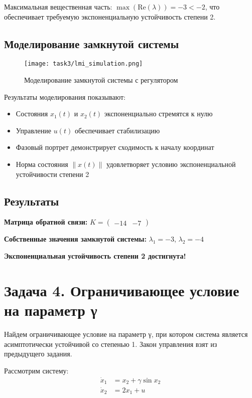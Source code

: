 Максимальная вещественная часть: $\max(\text{Re}(\lambda)) = -3 < -2$, что обеспечивает требуемую экспоненциальную устойчивость степени 2.

\subsection{Моделирование замкнутой системы}

\begin{figure}[H]
\centering
\texttt{[image: task3/lmi\_simulation.png]}
\caption{Моделирование замкнутой системы с регулятором}
\label{fig:lmi_simulation}
\end{figure}

Результаты моделирования показывают:
\begin{itemize}
\item Состояния $x_1(t)$ и $x_2(t)$ экспоненциально стремятся к нулю
\item Управление $u(t)$ обеспечивает стабилизацию
\item Фазовый портрет демонстрирует сходимость к началу координат
\item Норма состояния $\|x(t)\|$ удовлетворяет условию экспоненциальной устойчивости степени 2
\end{itemize}

\subsection{Результаты}

\textbf{Матрица обратной связи:} $K = \begin{pmatrix} -14 & -7 \end{pmatrix}$

\textbf{Собственные значения замкнутой системы:} $\lambda_1 = -3$, $\lambda_2 = -4$

\textbf{Экспоненциальная устойчивость степени 2 достигнута!}

\section{Задача 4. Ограничивающее условие на параметр γ}

Найдем ограничивающее условие на параметр γ, при котором система является асимптотически устойчивой со степенью 1. Закон управления взят из предыдущего задания.

Рассмотрим систему:
\begin{align}
\dot{x}_1 &= x_2 + \gamma \sin x_2 \\
\dot{x}_2 &= 2x_1 + u
\end{align}

